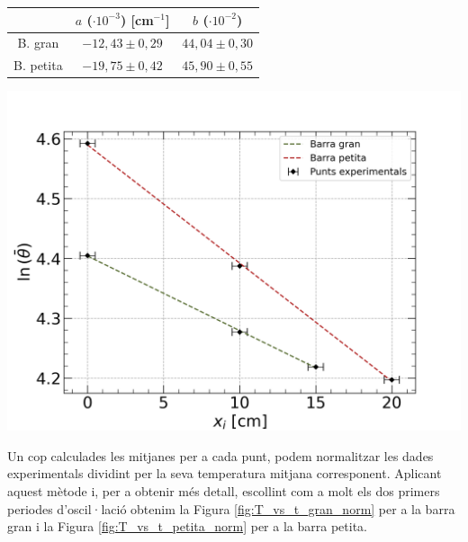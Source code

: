 \documentclass[12pt,twosides,onecolumn,openany]{article}
\newenvironment{Figura}
  {\par\medskip\noindent\minipage{\linewidth}}
  {\endminipage\par\medskip}
\begin{document}
\begin{multicols}{2}
\begin{Figura}
  \centering
  \begin{tabular}{c|c|c}
     & $a$ ($\cdot 10^{-3}$) [cm$^{-1}$] & $b$ ($\cdot 10^{-2}$) \\ \hline\hline
    B. gran & $-12,43\pm0,29$ & $44,04\pm0,30$\\
    B. petita & $-19,75\pm0,42$ & $45,90\pm0,55$
  \end{tabular}
  \label{Tau:pendent_mitjana}
\end{Figura}
\begin{Figura}
  \centering
  \includegraphics[width=1\linewidth]{../../graphs/practica_Ia/plots/linear_reg.png}
  \label{fig:lin_reg}
\end{Figura}
Un cop calculades les mitjanes per a cada punt, podem normalitzar les dades experimentals dividint per la seva temperatura mitjana corresponent. Aplicant aquest mètode i, per a obtenir més detall, escollint com a molt els dos primers periodes d'oscil·lació obtenim la Figura \ref{fig:T_vs_t_gran_norm} per a la barra gran i la Figura \ref{fig:T_vs_t_petita_norm} per a la barra petita.
\begin{Figura}
  \centering

\end{Figura}
\end{multicols}
\end{document}
